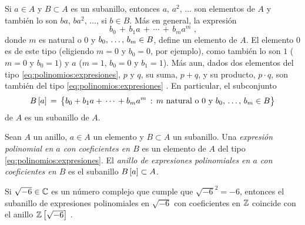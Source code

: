 \begin{obsPolinomios}\label{obs:polinomios:expresiones}
	Si $a\in A$ y $B\subset A$ es un subanillo, entonces
	$a,\,a^2,\,\dots$ son elementos de $A$ y tambi\'en lo son
	$ba,\,ba^2,\,\dots$, si $b\in B$. M\'as en general, la expresi\'on
	\begin{equation}
		\label{eq:polinomios:expresiones}
		b_0\,+\,b_1a\,+\,\cdots\,+\,b_ma^m
		\text{ ,}
	\end{equation}
	donde $m$ es natural o $0$ y $\lista[0] b{m}\in B$,
	define un elemento de $A$.
	El elemento $0$ es de este tipo (eligiendo $m=0$ y $b_0=0$,
	por ejemplo), como tambi\'en lo son $1$ ($m=0$ y $b_0=1$) y
	$a$ ($m=1$, $b_0=0$ y $b_1=1$).
	M\'as aun, dados dos elementos del tipo
	\eqref{eq:polinomios:expresiones}, $p$ y $q$, su suma, $p+q$, y su
	producto, $p\cdot q$, %
	son tambi\'en del tipo \eqref{eq:polinomios:expresiones}
	\quedacomoejercicio.
	En particular, el subconjunto
	\begin{displaymath}
		\polinomios B a\,=\,\big\{b_0+b_1a+\,\cdots\,+b_ma^m\,:\,
			m\text{ natural o } 0\text{ y }
			\lista[0] b{m}\in B\big\}
	\end{displaymath}
	de $A$ es un subanillo de $A$.
\end{obsPolinomios}

\begin{defPolinomios}\label{def:polinomios:expresiones}
	Sean $A$ un anillo, $a\in A$ un elemento y $B\subset A$ un subanillo.
	Una \emph{expresi\'on polinomial en $a$ con coeficientes en $B$}
	es un elemento de $A$ del tipo \eqref{eq:polinomios:expresiones}.
	El \emph{anillo de expresiones polinomiales en $a$ con coeficientes %
	en $B$} es el subanillo ${B}\left[a\right]\subset A$.
\end{defPolinomios}

\begin{ejemPolinomios}\label{ejem:polinomios:expresiones}
	Si $\sqrt{-6}\in\mathbb{C}$ es un n\'umero complejo que cumple que
	$\sqrt{-6}^2=-6$, entonces el subanillo de expresiones polinomiales
	en $\sqrt{-6}$ con coeficientes en $\mathbb{Z}$ coincide con el
	anillo ${\mathbb{Z}}\left[\sqrt{-6}\right]$
	\quedacomoejercicio.
\end{ejemPolinomios}

